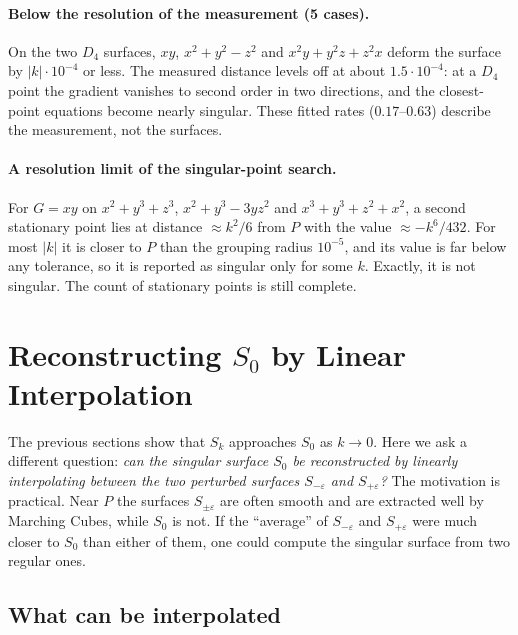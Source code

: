 \documentclass[12pt, a4paper]{article}
\theoremstyle{plain}
\theoremstyle{definition}
\theoremstyle{remark}
\theoremstyle{definition}
\begin{document}
\paragraph{Below the resolution of the measurement (5 cases).} On the two $D_4$
surfaces, $xy$, $x^2+y^2-z^2$ and $x^2y+y^2z+z^2x$ deform the surface by
$|k|\cdot10^{-4}$ or less. The measured distance levels off at about
$1.5\cdot10^{-4}$: at a $D_4$ point the gradient vanishes to second order in two
directions, and the closest-point equations become nearly singular. These fitted
rates ($0.17$--$0.63$) describe the measurement, not the surfaces.

\paragraph{A resolution limit of the singular-point search.} For $G=xy$ on
$x^2+y^3+z^3$, $x^2+y^3-3yz^2$ and $x^3+y^3+z^2+x^2$, a second stationary point lies at
distance $\approx k^2/6$ from $P$ with the value $\approx-k^6/432$. For most $|k|$
it is closer to $P$ than the grouping radius $10^{-5}$, and its value is far below
any tolerance, so it is reported as singular only for some $k$. Exactly, it is not
singular. The count of stationary points is still complete.

\section{Reconstructing $S_0$ by Linear Interpolation}
\label{sec:r-interp}

The previous sections show that $S_k$ approaches $S_0$ as $k\to0$. Here we ask
a different question: \emph{can the singular surface $S_0$ be reconstructed by
linearly interpolating between the two perturbed surfaces $S_{-\varepsilon}$ and
$S_{+\varepsilon}$?} The motivation is practical. Near $P$ the surfaces
$S_{\pm\varepsilon}$ are often smooth and are extracted well by Marching Cubes,
while $S_0$ is not. If the ``average'' of $S_{-\varepsilon}$ and
$S_{+\varepsilon}$ were much closer to $S_0$ than either of them, one could compute
the singular surface from two regular ones.

\subsection{What can be interpolated}
\label{sec:r-interp-methods}
\end{document}
